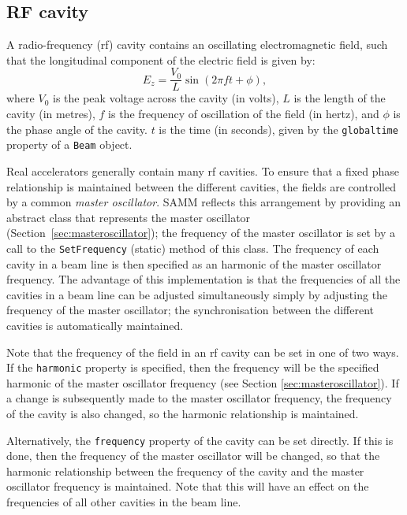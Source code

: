 \documentclass[11pt,twoside,a4paper]{article}
\begin{document}

\subsection{RF cavity\label{sec:rfcavity}}
A radio-frequency (rf) cavity contains an oscillating electromagnetic
field, such that the longitudinal component of the electric field is
given by:
\[
E_z = \frac{V_0}{L} \sin \left( 2\pi f t + \phi \right),
\]
where $V_0$ is the peak voltage across the cavity (in volts), $L$ is the
length of the cavity (in metres), $f$ is the frequency of oscillation
of the field (in hertz), and $\phi$ is the phase angle of the cavity.  $t$
is the time (in seconds), given by the \texttt{globaltime} property of
a \texttt{Beam} object.

Real accelerators generally contain many rf cavities.  To ensure that a
fixed phase relationship is maintained between the different cavities, the
fields are controlled by a common \emph{master oscillator}.  SAMM reflects
this arrangement by providing an abstract class that represents the master
oscillator (Section~\ref{sec:masteroscillator}); the frequency of the
master oscillator is set by a call to the \texttt{SetFrequency} (static)
method of this class.  The frequency of each cavity in a beam line is then
specified as an harmonic of the master oscillator frequency.  The advantage
of this implementation is that the frequencies of all the cavities in a
beam line can be adjusted simultaneously simply by adjusting the
frequency of the master oscillator; the synchronisation between the
different cavities is automatically maintained.

Note that the frequency of the field in an rf cavity can be set in one of
two ways.  If the \texttt{harmonic} property is specified, then the frequency
will be the specified harmonic of the master oscillator frequency (see
Section \ref{sec:masteroscillator}).  If a change is subsequently made to
the master oscillator frequency, the frequency of the cavity is also changed,
so the harmonic relationship is maintained.

Alternatively, the \texttt{frequency} property of the cavity can be set directly.
If this is done, then the frequency of the master oscillator will be changed,
so that the harmonic relationship between the frequency of the cavity and
the master oscillator frequency is maintained.  Note that this will have an
effect on the frequencies of all other cavities in the beam line.
\end{document}
